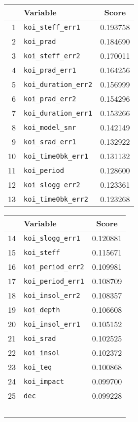 \begin{tabular}{rlc}
\toprule
                   &  Variable &     Score \\
\midrule
1  &     \texttt{koi\_steff\_err1} &  0.193758 \\
2  &            \texttt{koi\_prad} &  0.184690 \\
3  &     \texttt{koi\_steff\_err2} &  0.170011 \\
4  &      \texttt{koi\_prad\_err1} &  0.164256 \\
5  &  \texttt{koi\_duration\_err2} &  0.156999 \\
6  &      \texttt{koi\_prad\_err2} &  0.154296 \\
7  &  \texttt{koi\_duration\_err1} &  0.153266 \\
8  &      \texttt{koi\_model\_snr} &  0.142149 \\
9  &      \texttt{koi\_srad\_err1} &  0.132922 \\
10 &   \texttt{koi\_time0bk\_err1} &  0.131132 \\
11 &          \texttt{koi\_period} &  0.128600 \\
12 &     \texttt{koi\_slogg\_err2} &  0.123361 \\
13 &   \texttt{koi\_time0bk\_err2} &  0.123268 \\
\bottomrule
\end{tabular}
\quad
\begin{tabular}{rlc}
\toprule
                   &  Variable &     Score \\
\midrule
14 &    \texttt{koi\_slogg\_err1} &  0.120881 \\
15 &          \texttt{koi\_steff} &  0.115671 \\
16 &   \texttt{koi\_period\_err2} &  0.109981 \\
17 &   \texttt{koi\_period\_err1} &  0.108709 \\
18 &    \texttt{koi\_insol\_err2} &  0.108357 \\
19 &          \texttt{koi\_depth} &  0.106608 \\
20 &    \texttt{koi\_insol\_err1} &  0.105152 \\
21 &           \texttt{koi\_srad} &  0.102525 \\
22 &          \texttt{koi\_insol} &  0.102372 \\
23 &            \texttt{koi\_teq} &  0.100868 \\
24 &         \texttt{koi\_impact} &  0.099700 \\
25 &                 \texttt{dec} &  0.099228 \\
\, & & \\
\bottomrule
\end{tabular}
